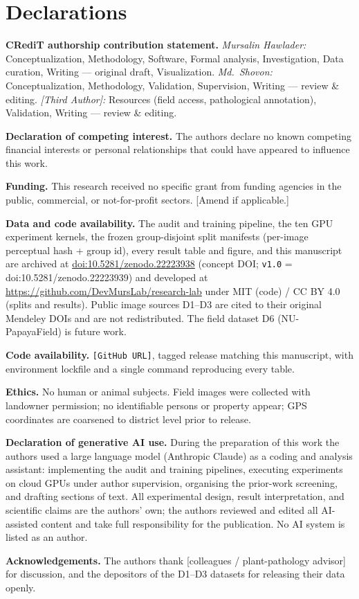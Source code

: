 \documentclass[10pt,twocolumn,a4paper]{article}
\begin{document}
\section*{Declarations}
\vspace{-2pt}
{\footnotesize
\noindent\textbf{CRediT authorship contribution statement.}
\textit{Mursalin Hawlader:} Conceptualization, Methodology, Software, Formal analysis, Investigation, Data curation, Writing --- original draft, Visualization.
\textit{Md.\ Shovon:} Conceptualization, Methodology, Validation, Supervision, Writing --- review \& editing.
\textit{[Third Author]:} Resources (field access, pathological annotation), Validation, Writing --- review \& editing.

\noindent\textbf{Declaration of competing interest.} The authors declare no known competing financial interests or personal relationships that could have appeared to influence this work.

\noindent\textbf{Funding.} This research received no specific grant from funding agencies in the public, commercial, or not-for-profit sectors. [Amend if applicable.]

\noindent\textbf{Data and code availability.} The audit and training pipeline, the ten GPU experiment kernels, the frozen group-disjoint split manifests (per-image perceptual hash + group id), every result table and figure, and this manuscript are archived at \href{https://doi.org/10.5281/zenodo.22223938}{doi:10.5281/zenodo.22223938} (concept DOI; \texttt{v1.0} = doi:10.5281/zenodo.22223939) and developed at \url{https://github.com/DevMursLab/research-lab} under MIT (code) / CC BY 4.0 (splits and results). Public image sources D1--D3 are cited to their original Mendeley DOIs and are not redistributed. The field dataset D6 (NU-PapayaField) is future work.

\noindent\textbf{Code availability.} \texttt{[GitHub URL]}, tagged release matching this manuscript, with environment lockfile and a single command reproducing every table.

\noindent\textbf{Ethics.} No human or animal subjects. Field images were collected with landowner permission; no identifiable persons or property appear; GPS coordinates are coarsened to district level prior to release.

\noindent\textbf{Declaration of generative AI use.} During the preparation of this work the authors used a large language model (Anthropic Claude) as a coding and analysis assistant: implementing the audit and training pipelines, executing experiments on cloud GPUs under author supervision, organising the prior-work screening, and drafting sections of text. All experimental design, result interpretation, and scientific claims are the authors' own; the authors reviewed and edited all AI-assisted content and take full responsibility for the publication. No AI system is listed as an author.

\noindent\textbf{Acknowledgements.} The authors thank [colleagues / plant-pathology advisor] for discussion, and the depositors of the D1--D3 datasets for releasing their data openly.
}
\end{document}
